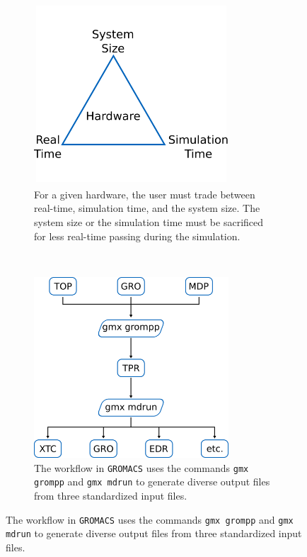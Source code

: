 \documentclass[9pt,tutorial]{livecoms}
\newcommand{\code}[1]{\colorbox{light-gray}{\texttt{#1}}}
\begin{document}
\begin{figure}
	\begin{subfigure}[c]{0.25\textwidth}
		\centering
		\includegraphics[width=0.8\textwidth]{figures/tradeoffTriangle.png}
		\caption{For a given hardware, the user must trade between real-time, simulation time, and the system size. The system size or the simulation time must be sacrificed for less real-time passing during the simulation.}
		\label{fig:tt}
	\end{subfigure}
	~
	\begin{subfigure}[c]{0.25\textwidth}
		\centering
		\includegraphics[width=0.8\textwidth]{figures/gromacsworkflow.png}
		\caption{The workflow in \texttt{GROMACS} uses the commands \code{gmx grompp} and \code{gmx mdrun} to generate diverse output files from three standardized input files.}
		\label{fig:gmxwf}
	\end{subfigure}
\end{figure}\noindent
\end{document}
